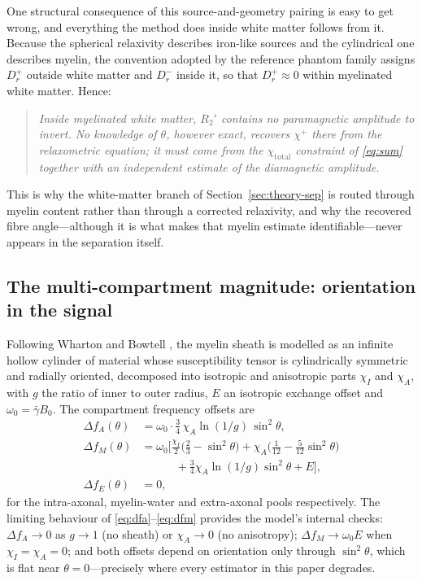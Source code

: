 \documentclass[AMA,STIX2COL,Linenumberson]{MRM}
\begin{document}
One structural consequence of this source-and-geometry pairing is easy to get wrong, and everything the method does inside white matter follows from it. Because the spherical relaxivity describes iron-like sources and the cylindrical one describes myelin, the convention adopted by the reference phantom family assigns $D_r^{+}$ outside white matter and $D_r^{-}$ inside it, so that $D_r^{+}\approx 0$ within myelinated white matter. Hence:

\begin{quote}
\emph{Inside myelinated white matter, $R_2'$ contains no paramagnetic amplitude to invert. No knowledge of $\theta$, however exact, recovers $\chi^{+}$ there from the relaxometric equation; it must come from the $\chi_{\mathrm{total}}$ constraint of \eqref{eq:sum} together with an independent estimate of the diamagnetic amplitude.}
\end{quote}

\noindent This is why the white-matter branch of Section~\ref{sec:theory-sep} is routed through myelin content rather than through a corrected relaxivity, and why the recovered fibre angle---although it is what makes that myelin estimate identifiable---never appears in the separation itself.

\subsection{The multi-compartment magnitude: orientation in the signal}

Following Wharton and Bowtell \cite{wharton_fiber_2012}, the myelin sheath is modelled as an infinite hollow cylinder of material whose susceptibility tensor is cylindrically symmetric and radially oriented, decomposed into isotropic and anisotropic parts $\chi_I$ and $\chi_A$, with $g$ the ratio of inner to outer radius, $E$ an isotropic exchange offset and $\omega_0=\bar\gamma B_0$. The compartment frequency offsets are
\begin{align}
\Delta f_{A}(\theta) &= \omega_0 \cdot \tfrac{3}{4}\,\chi_A \ln(1/g)\,\sin^{2}\theta, \label{eq:dfa}\\
\Delta f_{M}(\theta) &= \omega_0 \Big[ \tfrac{\chi_I}{2}\big(\tfrac{2}{3}-\sin^{2}\theta\big)
 + \chi_A\big(\tfrac{1}{12}-\tfrac{5}{12}\sin^{2}\theta\big) \nonumber\\
 &\qquad\quad + \tfrac{3}{4}\chi_A \ln(1/g)\sin^{2}\theta + E \Big], \label{eq:dfm}\\
\Delta f_{E}(\theta) &= 0, \label{eq:dfe}
\end{align}
for the intra-axonal, myelin-water and extra-axonal pools respectively. The limiting behaviour of \eqref{eq:dfa}--\eqref{eq:dfm} provides the model's internal checks: $\Delta f_A \to 0$ as $g\to1$ (no sheath) or $\chi_A\to0$ (no anisotropy); $\Delta f_M \to \omega_0 E$ when $\chi_I=\chi_A=0$; and both offsets depend on orientation only through $\sin^{2}\theta$, which is flat near $\theta=0$---precisely where every estimator in this paper degrades.
\end{document}
